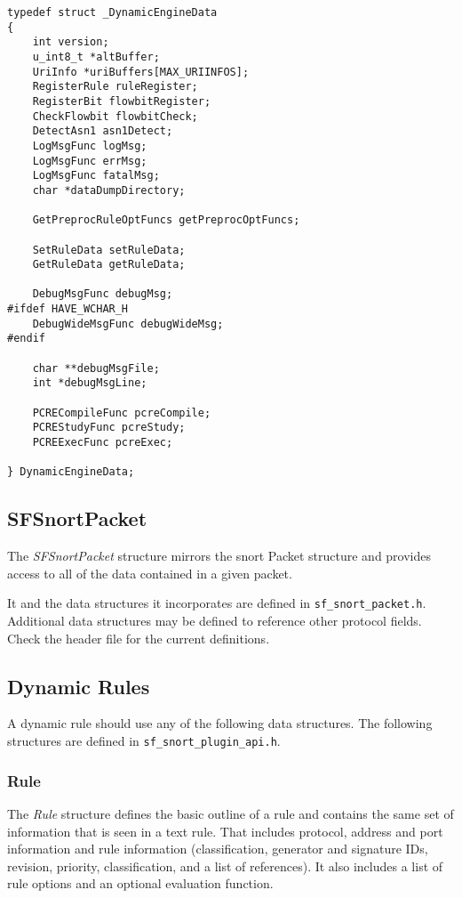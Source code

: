 \documentclass[english]{report}
\begin{document}
\begin{verbatim}
typedef struct _DynamicEngineData
{
    int version;
    u_int8_t *altBuffer;
    UriInfo *uriBuffers[MAX_URIINFOS];
    RegisterRule ruleRegister;
    RegisterBit flowbitRegister;
    CheckFlowbit flowbitCheck;
    DetectAsn1 asn1Detect;
    LogMsgFunc logMsg;
    LogMsgFunc errMsg;
    LogMsgFunc fatalMsg;
    char *dataDumpDirectory;

    GetPreprocRuleOptFuncs getPreprocOptFuncs;

    SetRuleData setRuleData;
    GetRuleData getRuleData;

    DebugMsgFunc debugMsg;
#ifdef HAVE_WCHAR_H
    DebugWideMsgFunc debugWideMsg;
#endif

    char **debugMsgFile;
    int *debugMsgLine;

    PCRECompileFunc pcreCompile;
    PCREStudyFunc pcreStudy;
    PCREExecFunc pcreExec;

} DynamicEngineData;
\end{verbatim}

\subsection{SFSnortPacket}

The {\em SFSnortPacket} structure mirrors the snort Packet structure and
provides access to all of the data contained in a given packet.

It and the data structures it incorporates are defined in
\texttt{sf\_snort\_packet.h}.  Additional data structures may be defined to
reference other protocol fields.  Check the header file for the current
definitions.

\subsection{Dynamic Rules}

A dynamic rule should use any of the following data structures.  The following
structures are defined in \texttt{sf\_snort\_plugin\_api.h}.

\subsubsection{Rule}

The {\em Rule} structure defines the basic outline of a rule and contains the
same set of information that is seen in a text rule.  That includes protocol,
address and port information and rule information (classification, generator
and signature IDs, revision, priority, classification, and a list of
references).  It also includes a list of rule options and an optional
evaluation function.
\end{document}
